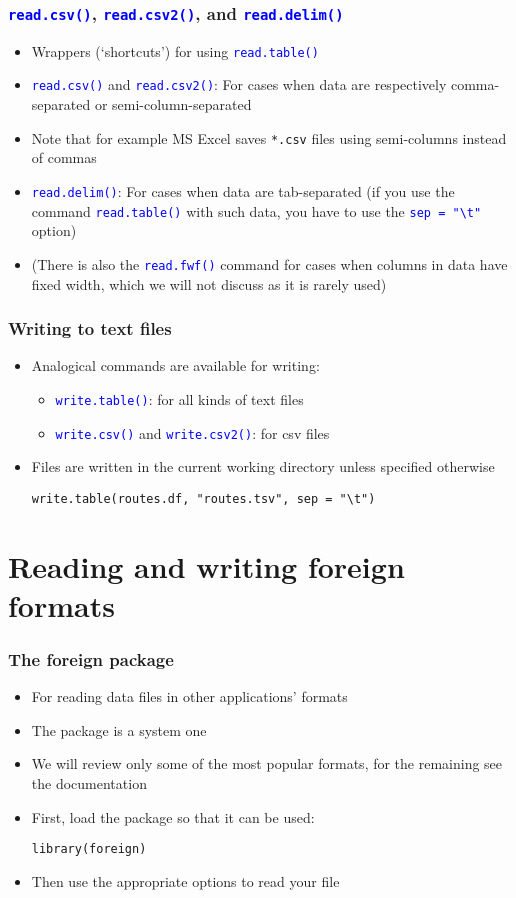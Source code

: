 \documentclass[10pt]{beamer}
\newcommand{\cc}[1]{\texttt{\textcolor{blue}{#1}}}
\theoremstyle{definition}
\begin{document}
\begin{frame}[fragile]
\frametitle{\cc{read.csv()}, \cc{read.csv2()}, and \cc{read.delim()}}
\begin{itemize}
	\item Wrappers (`shortcuts') for using \cc{read.table()}
	\item \cc{read.csv()} and \cc{read.csv2()}: For cases when data are respectively comma-separated or semi-column-separated
	\item Note that for example MS Excel saves \texttt{*.csv} files using semi-columns instead of commas
	\item \cc{read.delim()}: For cases when data are tab-separated (if you use the command \cc{read.table()} with such data, you have to use the \cc{sep = "\textbackslash t"} option)
	\item (There is also the \cc{read.fwf()} command for cases when  columns in data have fixed width, which we will not discuss as it is rarely used)
\end{itemize}
\end{frame}

\begin{frame}[fragile]
\frametitle{Writing to text files}
\begin{itemize}
	\item Analogical commands are available for writing:
	\begin{itemize}
		\item \cc{write.table()}: for all kinds of text files
		\item \cc{write.csv()} and \cc{write.csv2()}: for csv files
	\end{itemize}
	\item Files are written in the current working directory unless specified otherwise
	\begin{lstlisting}[style = rstyle, breaklines]
	write.table(routes.df, "routes.tsv", sep = "\t")
	\end{lstlisting}
\end{itemize}
\end{frame}

\section{Reading and writing foreign formats}
\begin{frame}[fragile]
\frametitle{The \textbf{foreign} package}
\begin{itemize}
	\item For reading data files in other applications' formats
	\item The package is a system one
	\item We will review only some of the most popular formats, for the remaining see the documentation
	\item First, load the package so that it can be used:
	\begin{lstlisting}[style = rstyle, breaklines]
	library(foreign)
	\end{lstlisting}
	\item Then use the appropriate options to read your file
\end{itemize}
\end{frame}
\end{document}
